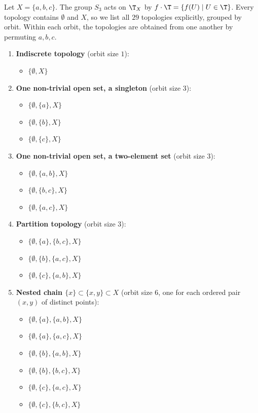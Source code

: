 
Let $X=\{a,b,c\}$. The group $S_3$ acts on $\T_X$ by $f\cdot\T=\{f(U)\mid U\in\T\}$. Every
topology contains $\emptyset$ and $X$, so we list all $29$ topologies explicitly, grouped by
orbit. Within each orbit, the topologies are obtained from one another by permuting $a,b,c$.

\begin{enumerate}
  \item \textbf{Indiscrete topology} (orbit size $1$):
  \begin{itemize}
    \item $\{\emptyset,X\}$
  \end{itemize}

  \item \textbf{One non-trivial open set, a singleton} (orbit size $3$):
  \begin{itemize}
    \item $\{\emptyset,\{a\},X\}$
    \item $\{\emptyset,\{b\},X\}$
    \item $\{\emptyset,\{c\},X\}$
  \end{itemize}

  \item \textbf{One non-trivial open set, a two-element set} (orbit size $3$):
  \begin{itemize}
    \item $\{\emptyset,\{a,b\},X\}$
    \item $\{\emptyset,\{b,c\},X\}$
    \item $\{\emptyset,\{a,c\},X\}$
  \end{itemize}

  \item \textbf{Partition topology} (orbit size $3$):
  \begin{itemize}
    \item $\{\emptyset,\{a\},\{b,c\},X\}$
    \item $\{\emptyset,\{b\},\{a,c\},X\}$
    \item $\{\emptyset,\{c\},\{a,b\},X\}$
  \end{itemize}

  \item \textbf{Nested chain $\{x\}\subset\{x,y\}\subset X$} (orbit size $6$, one for each
  ordered pair $(x,y)$ of distinct points):
  \begin{itemize}
    \item $\{\emptyset,\{a\},\{a,b\},X\}$
    \item $\{\emptyset,\{a\},\{a,c\},X\}$
    \item $\{\emptyset,\{b\},\{a,b\},X\}$
    \item $\{\emptyset,\{b\},\{b,c\},X\}$
    \item $\{\emptyset,\{c\},\{a,c\},X\}$
    \item $\{\emptyset,\{c\},\{b,c\},X\}$
  \end{itemize}


\end{enumerate}
